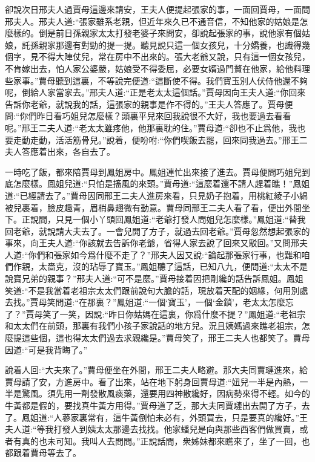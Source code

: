 \begin{parag}
    卻說次日邢夫人過賈母這邊來請安，王夫人便提起張家的事，一面回賈母，一面問邢夫人。邢夫人道:“張家雖系老親，但近年來久已不通音信，不知他家的姑娘是怎麼樣的。倒是前日孫親家太太打發老婆子來問安，卻說起張家的事，說他家有個姑娘，託孫親家那邊有對勁的提一提。聽見說只這一個女孩兒，十分嬌養，也識得幾個字，見不得大陣仗兒，常在房中不出來的。張大老爺又說，只有這一個女孩兒，不肯嫁出去，怕人家公婆嚴，姑娘受不得委屈，必要女婿過門贅在他家，給他料理些家事。”賈母聽到這裏，不等說完便道:“這斷使不得。我們寶玉別人伏侍他還不夠呢，倒給人家當家去。”邢夫人道:“正是老太太這個話。”賈母因向王夫人道:“你回來告訴你老爺，就說我的話，這張家的親事是作不得的。”王夫人答應了。賈母便問:“你們昨日看巧姐兒怎麼樣？頭裏平兒來回我說很不大好，我也要過去看看呢。”邢王二夫人道:“老太太雖疼他，他那裏耽的住。”賈母道:“卻也不止爲他，我也要走動走動，活活筋骨兒。”說着，便吩咐:“你們喫飯去罷，回來同我過去。”邢王二夫人答應着出來，各自去了。
\end{parag}


\begin{parag}
    一時吃了飯，都來陪賈母到鳳姐房中。鳳姐連忙出來接了進去。賈母便問巧姐兒到底怎麼樣。鳳姐兒道:“只怕是搐風的來頭。”賈母道:“這麼着還不請人趕着瞧！”鳳姐道:“已經請去了。”賈母因同邢王二夫人進房來看，只見奶子抱着，用桃紅綾子小綿被兒裹着，臉皮趣青，眉梢鼻翅微有動意。賈母同邢王二夫人看了看，便出外間坐下。正說間，只見一個小丫頭回鳳姐道:“老爺打發人問姐兒怎麼樣。”鳳姐道:“替我回老爺，就說請大夫去了。一會兒開了方子，就過去回老爺。”賈母忽然想起張家的事來，向王夫人道:“你該就去告訴你老爺，省得人家去說了回來又駁回。”又問邢夫人道:“你們和張家如今爲什麼不走了？”邢夫人因又說:“論起那張家行事，也難和咱們作親，太嗇克，沒的玷辱了寶玉。”鳳姐聽了這話，已知八九，便問道:“太太不是說寶兄弟的親事？”邢夫人道:“可不是麼。”賈母接着因把剛纔的話告訴鳳姐。鳳姐笑道:“不是我當着老祖宗太太們跟前說句大膽的話，現放着天配的姻緣，何用別處去找。”賈母笑問道:“在那裏？”鳳姐道:“一個‘寶玉’，一個‘金鎖’，老太太怎麼忘了？”賈母笑了一笑，因說:“昨日你姑媽在這裏，你爲什麼不提？”鳳姐道:“老祖宗和太太們在前頭，那裏有我們小孩子家說話的地方兒。況且姨媽過來瞧老祖宗，怎麼提這些個，這也得太太們過去求親纔是。”賈母笑了，邢王二夫人也都笑了。賈母因道:“可是我背晦了。”
\end{parag}


\begin{parag}
    說着人回:“大夫來了。”賈母便坐在外間，邢王二夫人略避。那大夫同賈璉進來，給賈母請了安，方進房中。看了出來，站在地下躬身回賈母道:“妞兒一半是內熱，一半是驚風。須先用一劑發散風痰藥，還要用四神散纔好，因病勢來得不輕。如今的牛黃都是假的，要找真牛黃方用得。”賈母道了乏，那大夫同賈璉出去開了方子，去了。鳳姐道:“人蔘家裏常有，這牛黃倒怕未必有，外頭買去，只是要真的纔好。”王夫人道:“等我打發人到姨太太那邊去找找。他家蟠兒是向與那些西客們做買賣，或者有真的也未可知。我叫人去問問。”正說話間，衆姊妹都來瞧來了，坐了一回，也都跟着賈母等去了。
\end{parag}


